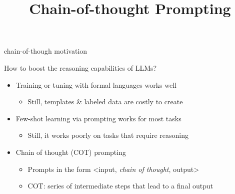 



\newcommand{\learninggoals}{
\item illustrate chain-of-thought and point out the benefits it brings to LLMs
\item illustrate tree-of-thought and point out the benefits it brings to LLMs 
}

\def\myblue#1{\textcolor{texblue}{#1}}

\title{Chain-of-thought Prompting}
\date{}




\begin{vbframe}{chain-of-though motivation}

\vfill

How to boost the reasoning capabilities of LLMs? 

\begin{itemize}
\item Training or tuning with formal languages works well
    \begin{itemize}
    \item Still, templates \& labeled data are costly to create
    \end{itemize}
\item Few-shot learning via prompting works for most tasks
    \begin{itemize}
    \item Still, it works poorly on tasks that require reasoning
    \end{itemize}
\item Chain of thought (COT) prompting
    \begin{itemize}
    \item Prompts in the form <input, \textit{chain of thought}, output>
    \item COT: series of intermediate steps that lead to a final output
    \end{itemize}

\end{itemize}

\vfill

\end{vbframe}

